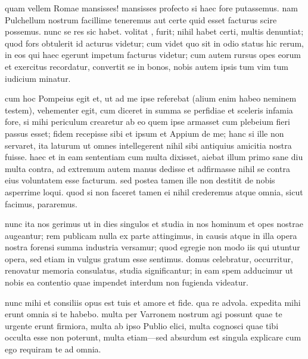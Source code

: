 


 quam vellem Romae mansisses! mansisses profecto si haec fore putassemus. nam Pulchellum nostrum facillime teneremus aut certe quid esset facturus scire possemus. nunc se res sic habet. volitat , furit; nihil habet certi, multis denuntiat; quod fors obtulerit id acturus videtur; cum videt quo sit in odio status hic rerum, in eos qui haec egerunt impetum facturus videtur; cum autem rursus opes eorum et exercitus recordatur, convertit se in bonos, nobis autem ipsis tum vim tum iudicium minatur.

 cum hoc Pompeius egit et, ut ad me ipse referebat (alium enim habeo neminem testem), vehementer egit, cum diceret in summa se perfidiae et sceleris infamia fore, si mihi periculum crearetur ab eo quem ipse armasset cum plebeium fieri passus esset; fidem recepisse sibi et ipsum et Appium de me; hanc si ille non servaret, ita laturum ut omnes intellegerent nihil sibi antiquius amicitia nostra fuisse. haec et in eam sententiam cum multa dixisset, aiebat illum primo sane diu multa contra, ad extremum autem manus dedisse et adfirmasse nihil se contra eius voluntatem esse facturum. sed postea tamen ille non destitit de nobis asperrime loqui. quod si non faceret tamen ei nihil crederemus atque omnia, sicut facimus, pararemus.

 nunc ita nos gerimus ut in dies singulos et studia in nos hominum et opes nostrae augeantur; rem publicam nulla ex parte attingimus, in causis atque in illa opera nostra forensi summa industria versamur; quod egregie non modo iis qui utuntur opera, sed etiam in vulgus gratum esse sentimus. domus celebratur, occurritur, renovatur memoria consulatus, studia significantur; in eam spem adducimur ut nobis ea contentio quae impendet interdum non fugienda videatur.

 nunc mihi et consiliis opus est tuis et amore et fide. qua re advola. expedita mihi erunt omnia si te habebo. multa per Varronem nostrum agi possunt quae te urgente erunt firmiora, multa ab ipso Publio elici, multa cognosci quae tibi occulta esse non poterunt, multa etiam—sed absurdum est singula explicare cum ego requiram te ad omnia.

